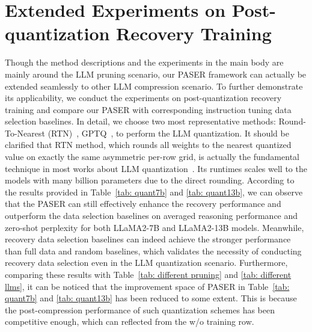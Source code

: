 \section{Extended Experiments on Post-quantization Recovery Training}
\label{appendix: post-quant}
Though the method descriptions and the experiments in the main body are mainly around the LLM pruning scenario, our PASER framework can actually be extended seamlessly to other LLM compression scenario. To further demonstrate its applicability, we conduct the experiments on post-quantization recovery training and compare our PASER with corresponding instruction tuning data selection baselines. In detail, we choose two most representative methods: Round-To-Nearest (RTN)~\citep{frantar2022optimal, yao2022zeroquant}, GPTQ~\citep{frantar2023optq}, to perform the LLM quantization. It should be clarified that RTN method, which rounds all weights to the nearest quantized value on exactly the same asymmetric per-row grid, is actually the fundamental technique in most works about LLM quantization~\citep{frantar2022optimal, yao2022zeroquant, parklut}. Its runtimes scales well to the models with many billion parameters due to the direct rounding. According to the results provided in Table~\ref{tab: quant7b} and \ref{tab: quant13b}, we can observe that the PASER can still effectively enhance the recovery performance and outperform the data selection baselines on averaged reasoning performance and zero-shot perplexity for both LLaMA2-7B and LLaMA2-13B models. Meanwhile, recovery data selection baselines can indeed achieve the stronger performance than full data and random baselines, which validates the necessity of conducting recovery data selection even in the LLM quantization scenario. Furthermore, comparing these results with Table~\ref{tab: different pruning} and \ref{tab: different llms}, it can be noticed that the improvement space of PASER in Table~\ref{tab: quant7b} and \ref{tab: quant13b} has been reduced to some extent. This is because the post-compression performance of such quantization schemes has been competitive enough, which can reflected from the w/o training row. 

